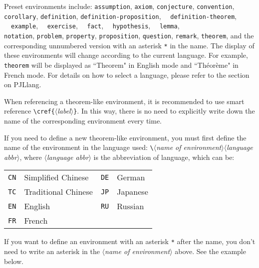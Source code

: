\documentclass[allowbf]{lebhart}
\providecommand{\meta}[1]{$\langle${\normalfont\itshape#1}$\rangle$}
\newenvironment{remind}[1][Remind]{%
    \begin{tcolorbox}[breakable,
        enhanced,
        width = \textwidth,
        colback = white, colbacktitle = paper,
        colframe = gray!50, boxrule=0.2mm,
        coltitle = black,
        fonttitle = \sffamily,
        attach boxed title to top left = {yshift=-\tcboxedtitleheight/2,  xshift=\tcboxedtitlewidth/4},
        boxed title style = {boxrule=0pt, colframe=paper},
        before skip = 0.3cm,
        after skip = 0.3cm,
        top = 3mm,
        bottom = 3mm,
        title={\scshape\sffamily #1}]%
}{\end{tcolorbox}}
\providecommand{\PJLlang}{\textsf{PJLlang}}
\begin{document}
Preset environments include: \texttt{assumption}, \texttt{axiom}, \texttt{conjecture}, \texttt{convention}, \texttt{corollary}, \texttt{definition}, \texttt{definition-proposition}, ~~\texttt{definition-theorem}, ~~\texttt{example}, ~~\texttt{exercise}, ~~\texttt{fact}, ~~\texttt{hypothesis}, ~~\texttt{lemma}, \\\texttt{notation}, \texttt{problem}, \texttt{property}, \texttt{proposition}, \texttt{question}, \texttt{remark}, \texttt{theorem}, and the corresponding unnumbered version with an asterisk \lstinline|*| in the name. The display of these environments will change according to the current language. For example, \texttt{theorem} will be displayed as ``Theorem" in English mode and ``Théorème" in French mode. For details on how to select a language, please refer to the section on \PJLlang{}.

When referencing a theorem-like environment, it is recommended to use smart reference \lstinline|\cref{|\meta{label}\texttt{\}}. In this way, there is no need to explicitly write down the name of the corresponding environment every time.

\medskip
If you need to define a new theorem-like environment, you must first define the name of the environment in the language used: \lstinline|\|\meta{name of environment}\meta{language abbr}, where \meta{language abbr} is the abbreviation of language, which can be:
\begin{longtable}{ll|ll}
    \texttt{CN} & Simplified Chinese & \texttt{DE} & German\\
    \texttt{TC} & Traditional Chinese & \texttt{JP} & Japanese\\
    \texttt{EN} & English & \texttt{RU} & Russian\\
    \texttt{FR} & French & &\\
\end{longtable}

\begin{remind}
    If you want to define an environment with an asterisk \lstinline|*| after the name, you don't need to write an asterisk in the \meta{name of environment} above. See the example below.
\end{remind}
\end{document}
